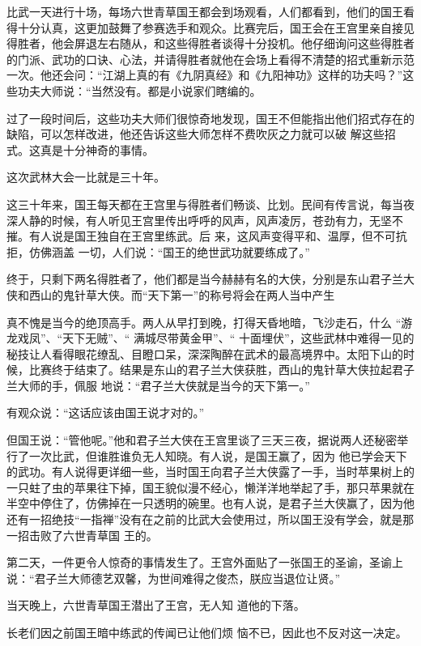 \documentclass{article}
\begin{document}
\newpage

比武一天进行十场，每场六世青草国王都会到场观看，人们都看到，他们的国王看得十分认真，这更加鼓舞了参赛选手和观众。比赛完后，国王会在王宫里亲自接见得胜者，他会屏退左右随从，和这些得胜者谈得十分投机。他仔细询问这些得胜者的门派、武功的口诀、心法，并请得胜者就他在会场上看得不清楚的招式重新示范一次。他还会问：“江湖上真的有《九阴真经》和《九阳神功》这样的功夫吗？”这些功夫大师说：“当然没有。都是小说家们瞎编的。

过了一段时间后，这些功夫大师们很惊奇地发现，国王不但能指出他们招式存在的缺陷，可以怎样改进，他还告诉这些大师怎样不费吹灰之力就可以破
解这些招式。这真是十分神奇的事情。 


这次武林大会一比就是三十年。 

这三十年来，国王每天都在王宫里与得胜者们畅谈、比划。民间有传言说，每当夜深人静的时候，有人听见王宫里传出呼呼的风声，风声凌厉，苍劲有力，无坚不摧。有人说是国王独自在王宫里练武。后
\newpage
来，这风声变得平和、温厚，但不可抗拒，仿佛涵盖
一切，人们说：“国王的绝世武功就要练成了。” 

终于，只剩下两名得胜者了，他们都是当今赫赫有名的大侠，分别是东山君子兰大侠和西山的鬼针草大侠。而“天下第一”的称号将会在两人当中产生

真不愧是当今的绝顶高手。两人从早打到晚，打得天昏地暗，飞沙走石，什么 “游龙戏凤”、“天下无贼”、“ 满城尽带黄金甲”、“ 十面埋伏”，这些武林中难得一见的秘技让人看得眼花缭乱、目瞪口呆，深深陶醉在武术的最高境界中。太阳下山的时候，比赛终于结束了。结果是东山的君子兰大侠获胜，西山的鬼针草大侠拉起君子兰大师的手，佩服
地说：“君子兰大侠就是当今的天下第一。” 


有观众说：“这话应该由国王说才对的。” 

但国王说：“管他呢。”他和君子兰大侠在王宫里谈了三天三夜，据说两人还秘密举行了一次比武，但谁胜谁负无人知晓。有人说，是国王赢了，因为
\newpage
他已学会天下的武功。有人说得更详细一些，当时国王向君子兰大侠露了一手，当时苹果树上的一只蛀了虫的苹果往下掉，国王貌似漫不经心，懒洋洋地举起了手，那只苹果就在半空中停住了，仿佛掉在一只透明的碗里。也有人说，是君子兰大侠赢了，因为他还有一招绝技“一指禅”没有在之前的比武大会使用过，所以国王没有学会，就是那一招击败了六世青草国
王的。 

第二天，一件更令人惊奇的事情发生了。王宫外面贴了一张国王的圣谕，圣谕上说：“君子兰大师德艺双馨，为世间难得之俊杰，朕应当退位让贤。”

当天晚上，六世青草国王潜出了王宫，无人知
道他的下落。 

长老们因之前国王暗中练武的传闻已让他们烦
恼不已，因此也不反对这一决定。 
\end{document}
